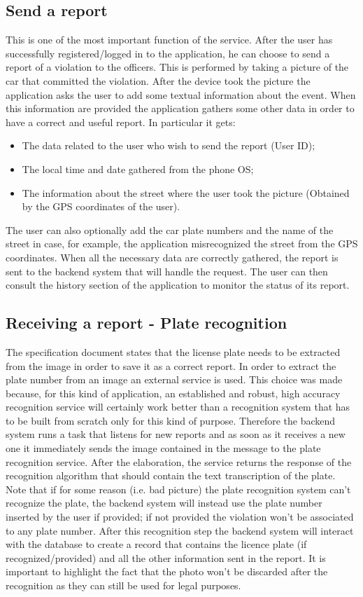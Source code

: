 \subsection{Send a report}
This is one of the most important function of the service. After the user has successfully registered/logged in to the application, he can choose to send a report of a violation to the officers. This is performed by taking a picture of the car that committed the violation. After the device took the picture the application asks the user to add some textual information about the event. When this information are provided the application gathers some other data in order to have a correct and useful report. In particular it gets: 
\begin{itemize}
  \item The data related to the user who wish to send the report (User ID);
  \item The local time and date gathered from the phone OS;
  \item The information about the street where the user took the picture (Obtained by the GPS coordinates of the user).
\end{itemize}

The user can also optionally add the car plate numbers and the name of the street in case, for example, the application misrecognized the street from the GPS coordinates. When all the necessary data are correctly gathered, the report is sent to the backend system that will handle the request. The user can then consult the history section of the application to monitor the status of its report.

\subsection{Receiving a report - Plate recognition}
The specification document states that the license plate needs to be extracted from the image in order to save it as a correct report. In order to extract the plate number from an image an external service is used. This choice was made because, for this kind of application, an established and robust, high accuracy recognition service will certainly work better than a recognition system that has to be built from scratch only for this kind of purpose. Therefore the backend system runs a task that listens for new reports and as soon as it receives a new one it immediately sends the image contained in the message to the plate recognition service. After the elaboration, the service returns the response of the recognition algorithm that should contain the text transcription of the plate. Note that if for some reason (i.e. bad picture) the plate recognition system can't recognize the plate, the backend system will instead use the plate number inserted by the user if provided; if not provided the violation won't be associated to any plate number. After this recognition step the backend system will interact with the database to create a record that contains the licence plate (if recognized/provided) and all the other information sent in the report. It is important to highlight the fact that the photo won't be discarded after the recognition as they can still be used for legal purposes.

